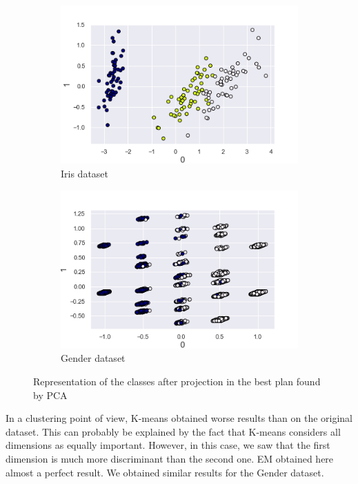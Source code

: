 \documentclass[twocolumn, 10pt]{article}
\begin{document}
			\begin{figure}[h]
				\centering
				\begin{subfigure}[t]{0.49\columnwidth}
					\centering
					\includegraphics[width=\linewidth]{../graphics/pca_iris_0_1_label.png}
					\caption{Iris dataset}
					\label{fig:pca_iris}
				\end{subfigure}
				\begin{subfigure}[t]{0.49\columnwidth}
					\centering
					\includegraphics[width=\linewidth]{../graphics/pca_g_0_1_label.png}
					\caption{Gender dataset}
					\label{fig:pca_g}
				\end{subfigure}
				\caption{Representation of the classes after projection in the best plan found by PCA}
				\label{fig:pca}
			\end{figure}

			In a clustering point of view, K-means obtained worse results than on the original dataset. This can probably be explained by the fact that K-means considers all dimensions as equally important. However, in this case, we saw that the first dimension is much more discriminant than the second one. EM obtained here almost a perfect result. We obtained similar results for the Gender dataset.
\end{document}
